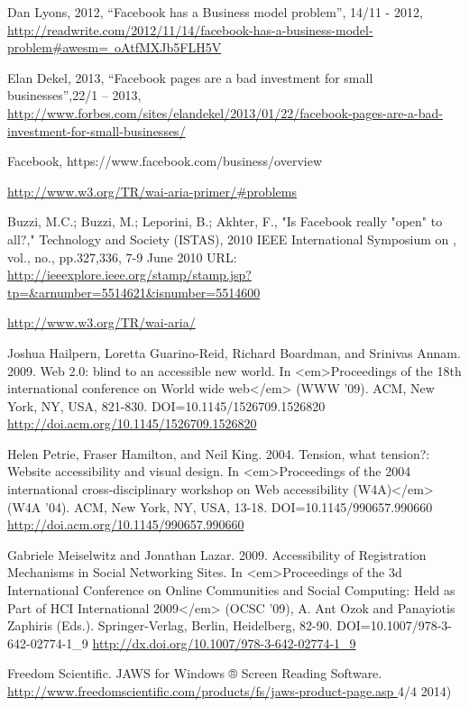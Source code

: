\documentclass[conference]{IEEEtran}
\begin{document}
\begin{thebibliography}{1}
Dan Lyons, 2012, “Facebook has a Business model problem”, 14/11 - 2012,
\href{http://readwrite.com/2012/11/14/facebook-has-a-business-model-problem\#awesm=~oAtfMXJb5FLH5V}{http://readwrite.com/2012/11/14/facebook-has-a-business-model-problem\#awesm=~oAtfMXJb5FLH5V}

Elan Dekel, 2013, “Facebook pages are a bad investment for small
businesses”,22/1 – 2013,
\href{http://www.forbes.com/sites/elandekel/2013/01/22/facebook-pages-are-a-bad-investment-for-small-businesses/}{http://www.forbes.com/sites/elandekel/2013/01/22/facebook-pages-are-a-bad-investment-for-small-businesses/}

Facebook, https://www.facebook.com/business/overview

    \href{http://www.w3.org/TR/wai-aria-primer/\#problems}{http://www.w3.org/TR/wai-aria-primer/\#problems }

Buzzi, M.C.; Buzzi, M.; Leporini, B.; Akhter, F., "Is Facebook really "open" to
all?," Technology and Society (ISTAS), 2010 IEEE International Symposium on ,
vol., no., pp.327,336, 7-9 June 2010
URL: \href{http://ieeexplore.ieee.org/stamp/stamp.jsp?tp=\&arnumber=5514621\&isnumber=5514600}{http://ieeexplore.ieee.org/stamp/stamp.jsp?tp=\&arnumber=5514621\&isnumber=5514600}

    \href{http://www.w3.org/TR/wai-aria/}{http://www.w3.org/TR/wai-aria/ }

Joshua Hailpern, Loretta Guarino-Reid, Richard Boardman, and Srinivas Annam.
2009. Web 2.0: blind to an accessible new world.  In <em>Proceedings of the
18th international conference on World wide web</em> (WWW '09). ACM, New York,
NY, USA,  821-830. DOI=10.1145/1526709.1526820
\href{http://doi.acm.org/10.1145/1526709.1526820}{http://doi.acm.org/10.1145/1526709.1526820}

Helen Petrie, Fraser Hamilton, and Neil King. 2004. Tension, what tension?:
Website accessibility and visual design.  In <em>Proceedings of the 2004
international cross-disciplinary workshop on Web accessibility (W4A)</em> (W4A
'04). ACM, New York, NY, USA,  13-18. DOI=10.1145/990657.990660
\href{http://doi.acm.org/10.1145/990657.990660}{http://doi.acm.org/10.1145/990657.990660}

Gabriele Meiselwitz and Jonathan Lazar. 2009. Accessibility of Registration
Mechanisms in Social Networking Sites.  In <em>Proceedings of the 3d
International Conference on Online Communities and Social Computing: Held as
Part of HCI International 2009</em> (OCSC '09), A. Ant Ozok and Panayiotis
Zaphiris (Eds.). Springer-Verlag, Berlin, Heidelberg,  82-90.
DOI=10.1007/978-3-642-02774-1\_9 \href{http://dx.doi.org/10.1007/978-3-642-02774-1\_9}{http://dx.doi.org/10.1007/978-3-642-02774-1\_9}

Freedom Scientific. JAWS for Windows ® Screen Reading Software.
\href{http://www.freedomscientific.com/products/fs/jaws-product-page.asp}{http://www.freedomscientific.com/products/fs/jaws-product-page.asp }
4/4 2014)

\end{thebibliography}
\end{document}
